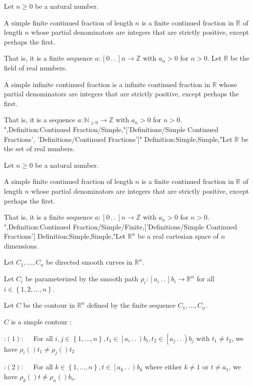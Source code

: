 Let $n \ge 0$ be a natural number.


A simple finite continued fraction of length $n$ is a finite continued fraction in $\mathbb R$ of length $n$ whose partial denominators are integers that are strictly positive, except perhaps the first.

That is, it is a finite sequence $a: \left[ 0 \,.\,.\,   \right]n \to \mathbb Z$ with $a_n > 0$ for $n > 0$.
Let $\mathbb R$ be the field of real numbers.


A simple infinite continued fraction is a infinite continued fraction in $\mathbb R$ whose partial denominators are integers that are strictly positive, except perhaps the first.

That is, it is a sequence $a: \mathbb N_{\ge 0} \to \mathbb Z$ with $a_n > 0$ for $n > 0$.
",Definition:Continued Fraction/Simple,"['Definitions/Simple Continued Fractions', 'Definitions/Continued Fractions']"
Definition:Simple,Simple,"Let $\mathbb R$ be the set of real numbers.

Let $n \ge 0$ be a natural number.


A simple finite continued fraction of length $n$ is a finite continued fraction in $\mathbb R$ of length $n$ whose partial denominators are integers that are strictly positive, except perhaps the first.

That is, it is a finite sequence $a: \left[ 0 \,.\,.\,   \right]n \to \mathbb Z$ with $a_n > 0$ for $n > 0$.
",Definition:Continued Fraction/Simple/Finite,['Definitions/Simple Continued Fractions']
Definition:Simple,Simple,"Let $\mathbb R^n$ be a real cartesian space of $n$ dimensions.

Let $C_1, \ldots, C_n$ be directed smooth curves in $\mathbb R^n$.

Let $C_i$ be parameterized by the smooth path $\rho_i: \left[ a_i \,.\,.\,   \right]{b_i} \to \mathbb R^n$ for all $i \in \left\lbrace 1, 2, \ldots, n \right\rbrace$.

Let $C$ be the contour in $\mathbb R^n$ defined by the finite sequence $C_1, \ldots, C_n$.


$C$ is a simple contour :

:$(1): \quad$ For all $i, j \in \left\lbrace 1, \ldots, n \right\rbrace, t_1 \in \left[ a_i \,.\,.\,   \right){b_i}, t_2 \in \left[ a_j \,.\,.\,   \right){b_j}$ with $t_1 \ne t_2$, we have $\rho_i \left(   \right){t_1} \ne \rho_j \left(   \right){t_2}$

:$(2): \quad$ For all $k \in \left\lbrace 1, \ldots, n \right\rbrace, t \in \left[ a_k \,.\,.\,   \right){b_k}$ where either $k \ne 1$ or $t \ne a_1$, we have $\rho_k \left(   \right)t \ne \rho_n \left(   \right){b_n}$.


